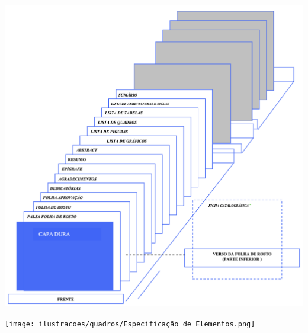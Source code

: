 \begin{figura}[h!]
  \centering
  \addfigura
  \includegraphics[width=1\textwidth]{ilustracoes/figuras/Elementos Pre Textuais.png}
  \label{figura:ElementosPreTextuais}
\end{figura}


\begin{quadro} [h!]
  \centering
  \addquadro
  \texttt{[image: ilustracoes/quadros/Especificação de Elementos.png]}
  \label{quadro:EspecificacaoElementos}
\end{quadro}




